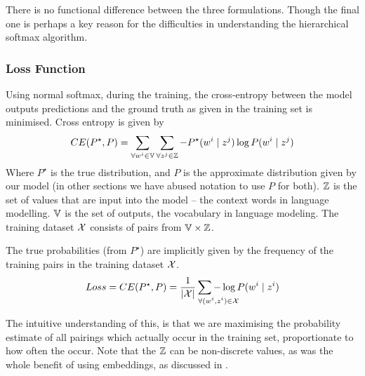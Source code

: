\documentclass[parskip]{komatufte}
\begin{document}
There is no functional difference between the three formulations.
Though the final one is perhaps a key reason for the difficulties in understanding the hierarchical softmax algorithm.

\subsubsection{Loss Function}\label{sec:softmax-loss-function}


Using normal softmax, during the training, the cross-entropy between the model outputs predictions and the ground truth as given in the training set is minimised.
Cross entropy is given by
\begin{equation}
CE(P^\star, P) = \sum_{\forall \n w_i\in \set{V}} \sum_{\forall \n z_j \in \set{Z}} -P^\star(\n w_i \mid \n z_j) \log P(\n w_i \mid \n z_j)
\end{equation}
Where $P^\star$ is the true distribution, and $P$ is the approximate distribution given by our model (in other sections we have abused notation to use $P$ for both).
$\mathbb{Z}$ is the set of values that are input into the model -- the context words in language modelling.
$\mathbb{V}$ is the set of outputs, the vocabulary in language modeling.
The training dataset $\mathcal{X}$ consists of pairs from $\mathbb{V} \times \mathbb{Z}$.

The true probabilities (from $P^\star$) are implicitly given by the frequency of the training pairs in the training dataset $\mathcal{X}$.
\begin{equation}
Loss=CE(P^\star, P) = \frac{1}{|\seq{X}|} \sum_{\mathrlap{\!\!\!\!\!\forall (\n w_i, \n z_i) \in \seq{X}}} -\log P(\n w_i \mid \n z_i)
\end{equation}


The intuitive understanding of this, is that we are maximising the probability estimate of all pairings which actually occur in the training set, proportionate to how often the occur.
Note that the $\mathbb{Z}$ can be non-discrete values, as was the whole benefit of using embeddings, as discussed in .
\end{document}
